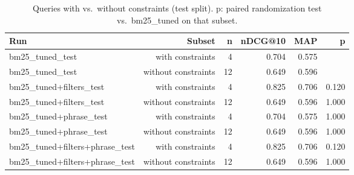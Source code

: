 \begin{table}[t]
\centering
\small
\begin{tabular}{lrrrrr}
\toprule
Run & Subset & n & nDCG@10 & MAP & p \\
\midrule
bm25\_tuned\_test & with constraints & 4 & 0.704 & 0.575 &  \\
bm25\_tuned\_test & without constraints & 12 & 0.649 & 0.596 &  \\
bm25\_tuned+filters\_test & with constraints & 4 & 0.825 & 0.706 & 0.120 \\
bm25\_tuned+filters\_test & without constraints & 12 & 0.649 & 0.596 & 1.000 \\
bm25\_tuned+phrase\_test & with constraints & 4 & 0.704 & 0.575 & 1.000 \\
bm25\_tuned+phrase\_test & without constraints & 12 & 0.649 & 0.596 & 1.000 \\
bm25\_tuned+filters+phrase\_test & with constraints & 4 & 0.825 & 0.706 & 0.120 \\
bm25\_tuned+filters+phrase\_test & without constraints & 12 & 0.649 & 0.596 & 1.000 \\
\bottomrule
\end{tabular}
\caption{Queries with vs.\ without constraints (test split). p: paired randomization test vs.\ bm25\_tuned on that subset.}
\label{tab:filters-subset}
\end{table}
